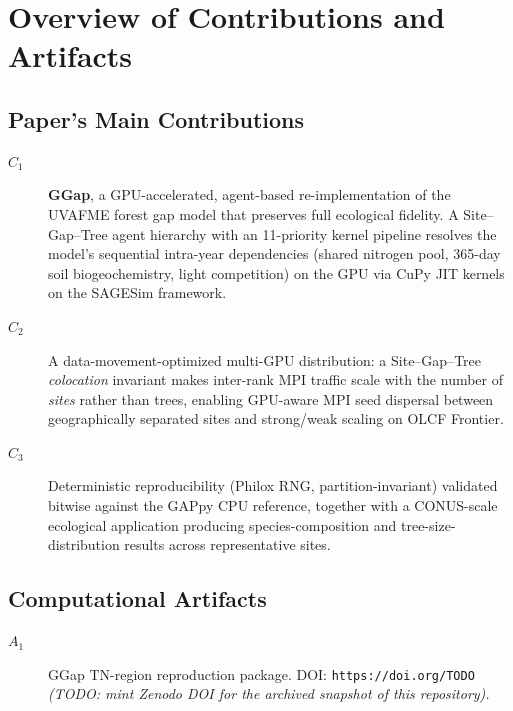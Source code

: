 \documentclass[conference]{IEEEtran}
\begin{document}


\appendixAD

\section{Overview of Contributions and Artifacts}

\subsection{Paper's Main Contributions}

\begin{description}
\item[$C_1$] \textbf{GGap}, a GPU-accelerated, agent-based re-implementation of the
  UVAFME forest gap model that preserves full ecological fidelity. A Site--Gap--Tree
  agent hierarchy with an 11-priority kernel pipeline resolves the model's sequential
  intra-year dependencies (shared nitrogen pool, 365-day soil biogeochemistry, light
  competition) on the GPU via CuPy JIT kernels on the SAGESim framework.
\item[$C_2$] A data-movement-optimized multi-GPU distribution: a Site--Gap--Tree
  \emph{colocation} invariant makes inter-rank MPI traffic scale with the number of
  \emph{sites} rather than trees, enabling GPU-aware MPI seed dispersal between
  geographically separated sites and strong/weak scaling on OLCF Frontier.
\item[$C_3$] Deterministic reproducibility (Philox RNG, partition-invariant) validated
  bitwise against the GAPpy CPU reference, together with a CONUS-scale ecological
  application producing species-composition and tree-size-distribution results across
  representative sites.
\end{description}

\subsection{Computational Artifacts}

\begin{description}
\item[$A_1$] GGap TN-region reproduction package. DOI: \texttt{https://doi.org/TODO}
  \emph{(TODO: mint Zenodo DOI for the archived snapshot of this repository).}
\end{description}
\end{document}
